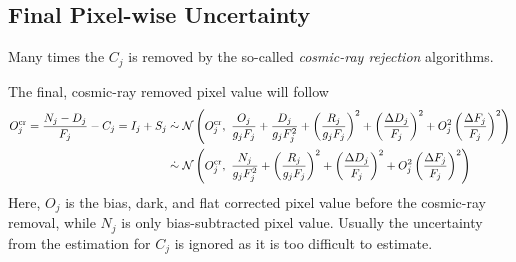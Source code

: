 \subsection{Final Pixel-wise Uncertainty}
Many times the $ C_j $ is removed by the so-called \emph{cosmic-ray rejection} algorithms. 
\begin{thm}
The final, cosmic-ray removed pixel value will follow
\begin{equation} \label{eq: pix error}
\begin{aligned}
  O_j^\mathrm{cr} = \frac{N_j - D_j}{F_j} - C_j = I_j + S_j 
    &\mathrel{\dot{\sim}} \mathcal{N} 
      \left ( O_j^\mathrm{cr},~ 
        \frac{O_j}{g_jF_j} 
        + \frac{D_j}{g_j F_j^2} 
        + \left (\frac{R_j}{g_j F_j} \right )^2 
        + \left (\frac{\Delta D_j}{F_j} \right )^2 
        + O_j^2 \left (\frac{\Delta F_j}{F_j} \right )^2
        \right ) \\
    &\mathrel{\dot{\sim}} \mathcal{N} 
      \left ( O_j^\mathrm{cr},~ 
        \frac{N_j}{g_jF_j^2} 
        + \left (\frac{R_j}{g_j F_j} \right )^2 
        + \left  (\frac{\Delta D_j}{F_j} \right )^2 
        + O_j^2 \left (\frac{\Delta F_j}{F_j} \right )^2
        \right ) 
\end{aligned}
\end{equation}
Here, $ O_j $ is the bias, dark, and flat corrected pixel value before the cosmic-ray removal, while $ N_j $ is only bias-subtracted pixel value. Usually the uncertainty from the estimation for $ C_j $ is ignored as it is too difficult to estimate. 
\end{thm}


